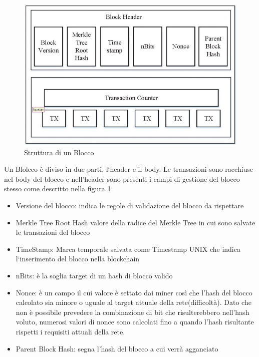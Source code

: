 \documentclass[12pt]{report}
\begin{document}
\begin{figure}[h]
	\includegraphics[width=\textwidth]{bcbl}
	\centering
	\caption{Struttura di un Blocco}
	\label{fig:blockblockchain1}
\end{figure}

Un Blolcco è diviso in due parti, l`header e il body. Le transazioni sono racchiuse nel body del blocco e nell'header sono presenti i campi di gestione del blocco stesso come descritto nella figura \ref{fig:blockblockchain1}.


\begin{itemize}
  \item Versione del blocco: indica le regole di validazione del blocco da rispettare
  \item Merkle Tree Root Hash valore della radice del Merkle Tree in cui sono salvate le transazioni del blocco
  \item TimeStamp: Marca temporale salvata come Timestamp UNIX che indica l`inserimento del blocco nella blockchain
  \item nBits: è la soglia target di un hash di blocco valido
  \item Nonce: è un campo il cui valore è settato dai miner così che l’hash del blocco
calcolato sia minore o uguale al target attuale della rete(difficoltà). Dato che non
è possibile prevedere la combinazione di bit che risulterebbero nell’hash voluto,
numerosi valori di nonce sono calcolati fino a quando l’hash risultante rispetti i
requisiti attuali della rete.
\item Parent Block Hash: segna l'hash del blocco a cui verrà agganciato
\end{itemize}
\end{document}
